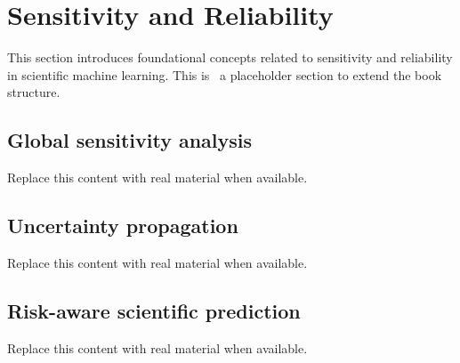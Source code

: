 \section{Sensitivity and Reliability}
This section introduces foundational concepts related to sensitivity and reliability in scientific machine learning. This is~\cite{abdulmaksoudTransformerBasedSensorFusion2025} a placeholder section to extend the book structure.

\subsection{Global sensitivity analysis}
Replace this content with real material when available.

\subsection{Uncertainty propagation}
Replace this content with real material when available.

\subsection{Risk-aware scientific prediction}
Replace this content with real material when available.
